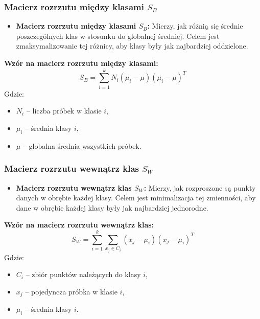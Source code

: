 \documentclass{beamer}
\begin{document}
\begin{frame}
    \frametitle{Macierz rozrzutu między klasami \( S_B \)}

    \begin{itemize}
        \item \textbf{Macierz rozrzutu między klasami \( S_B \):}  
        Mierzy, jak różnią się średnie poszczególnych klas w stosunku do globalnej średniej. Celem jest zmaksymalizowanie tej różnicy, aby klasy były jak najbardziej oddzielone.
    \end{itemize}

    \bigskip
    \textbf{Wzór na macierz rozrzutu między klasami:}
    \[
    S_B = \sum_{i=1}^{k} N_i (\mu_i - \mu)(\mu_i - \mu)^T
    \]
    Gdzie:
    \begin{itemize}
        \item \( N_i \) – liczba próbek w klasie \( i \),
        \item \( \mu_i \) – średnia klasy \( i \),
        \item \( \mu \) – globalna średnia wszystkich próbek.
    \end{itemize}
\end{frame}

\begin{frame}
    \frametitle{Macierz rozrzutu wewnątrz klas \( S_W \)}

    \begin{itemize}
        \item \textbf{Macierz rozrzutu wewnątrz klas \( S_W \):}  
        Mierzy, jak rozproszone są punkty danych w obrębie każdej klasy. Celem jest minimalizacja tej zmienności, aby dane w obrębie każdej klasy były jak najbardziej jednorodne.
    \end{itemize}

    \bigskip
    \textbf{Wzór na macierz rozrzutu wewnątrz klas:}
    \[
    S_W = \sum_{i=1}^{k} \sum_{x_j \in C_i} (x_j - \mu_i)(x_j - \mu_i)^T
    \]
    Gdzie:
    \begin{itemize}
        \item \( C_i \) – zbiór punktów należących do klasy \( i \),
        \item \( x_j \) – pojedyncza próbka w klasie \( i \),
        \item \( \mu_i \) – średnia klasy \( i \).
    \end{itemize}
\end{frame}
\end{document}
